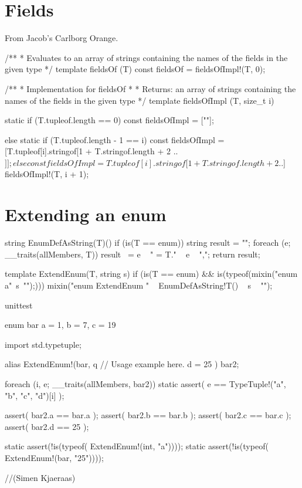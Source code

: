 \section{Fields}

From Jacob's Carlborg Orange.


\begin{dcode}
/**
 * Evaluates to an array of strings containing the names of the fields in the given type
 */
template fieldsOf (T)
{
	const fieldsOf = fieldsOfImpl!(T, 0);
}

/**
 * Implementation for fieldsOf
 * 
 * Returns: an array of strings containing the names of the fields in the given type
 */
template fieldsOfImpl (T, size_t i)
{
	static if (T.tupleof.length == 0)
		const fieldsOfImpl = [""];

	else static if (T.tupleof.length - 1 == i)
		const fieldsOfImpl = [T.tupleof[i].stringof[1 + T.stringof.length + 2 .. $]];

	else
		const fieldsOfImpl = T.tupleof[i].stringof[1 + T.stringof.length + 2 .. $] ~ fieldsOfImpl!(T, i + 1);
}
\end{dcode}

\section{Extending an enum}

\begin{dcode}
string EnumDefAsString(T)() if (is(T == enum)) {
  string result = "";
  foreach (e; __traits(allMembers, T)) {
      result ~= e ~ " = T." ~ e ~ ",";
  }
  return result;
}

template ExtendEnum(T, string s) if (is(T == enum) &&
is(typeof({mixin("enum a{"~s~"}");}))) {
  mixin("enum ExtendEnum {" ~
      EnumDefAsString!T() ~ s ~
  "}");
}

unittest {
  enum bar {
      a = 1,
      b = 7,
      c = 19
  }

  import std.typetuple;

  alias ExtendEnum!(bar, q{ // Usage example here.
      d = 25
  }) bar2;

  foreach (i, e; __traits(allMembers, bar2)) {
      static assert( e == TypeTuple!("a", "b", "c", "d")[i] );
  }

  assert( bar2.a == bar.a );
  assert( bar2.b == bar.b );
  assert( bar2.c == bar.c );
  assert( bar2.d == 25 );

  static assert(!is(typeof( ExtendEnum!(int, "a"))));
  static assert(!is(typeof( ExtendEnum!(bar, "25"))));
}

//(Simen Kjaeraas)
\end{dcode}

